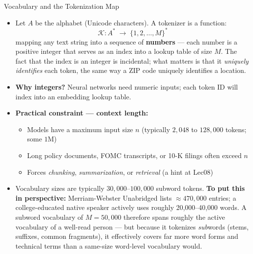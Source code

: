 \begin{frame}{Vocabulary and the Tokenization Map}
\begin{itemize}
\item Let $A$ be the alphabet (Unicode characters). A tokenizer is a function:
\[
   \mathcal{K}\colon A^{*} \;\longrightarrow\; \{1, 2, \ldots, M\}^{*}
\]
mapping any text string into a sequence of \textbf{numbers} --- each number is a positive integer that serves as an index into a lookup table of size $M$. The fact that the index is an integer is incidental; what matters is that it \emph{uniquely identifies} each token, the same way a ZIP code uniquely identifies a location.

\medskip
\item \textbf{Why integers?} Neural networks need numeric inputs; each token ID will index into an embedding lookup table.

\medskip
\item \textbf{Practical constraint --- context length:}
\begin{itemize}
    \item Models have a maximum input size $n$ (typically $2{,}048$ to $128{,}000$ tokens; some $1$M)
    \item Long policy documents, FOMC transcripts, or 10-K filings often exceed $n$
    \item Forces \emph{chunking}, \emph{summarization}, or \emph{retrieval} (a hint at Lec08)
\end{itemize}

\medskip
\item Vocabulary sizes are typically $30{,}000$--$100{,}000$ subword tokens. \textbf{To put this in perspective:} Merriam-Webster Unabridged lists $\approx470{,}000$ entries; a college-educated native speaker actively uses roughly 20{,}000--40{,}000 words. A subword vocabulary of $M=50{,}000$ therefore spans roughly the active vocabulary of a well-read person --- but because it tokenizes \emph{sub}words (stems, suffixes, common fragments), it effectively covers far more word forms and technical terms than a same-size word-level vocabulary would.
\end{itemize}
\end{frame}

